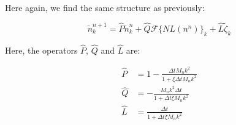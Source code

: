 \documentclass[11pt]{article}
\newcommand{\til}{\tilde}
\begin{document}
Here again, we find the same structure as previously:

\begin{equation}
\til{n}_k^{n+1} = \hat{P}\til{n}_k^n + \hat{Q}\mathcal{F}\lbrace NL(n^n)\rbrace_k + \hat{L} \til{\zeta}_k
\end{equation}

Here, the operators $\hat{P}$, $\hat{Q}$ and $\hat{L}$ are:

\begin{align}
\hat{P} &= 1 - \frac{\Delta t M_n k^2}{1 + \xi\Delta t M_n k^2}  \\
\hat{Q} &= -\frac{M_n k^2 \Delta t}{1 + \Delta t \xi M_n k^2} \\
\hat{L} &= \frac{\Delta t}{1 + \Delta t \xi M_n k^2} 
\end{align}
\end{document}
